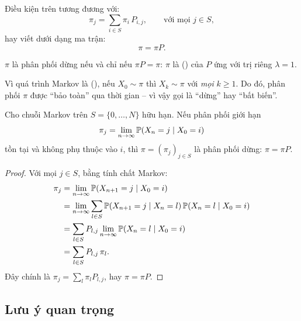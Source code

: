 Điều kiện trên tương đương với:
\begin{equation}\label{eq:stationary-condition}
  \pi_j = \sum_{i \in S} \pi_i \, P_{i,j}, \qquad \text{với mọi } j \in S,
\end{equation}
hay viết dưới dạng ma trận:
\begin{equation}\label{eq:pi-P}
  \boxed{\pi = \pi P.}
\end{equation}

\begin{tomtat}
$\pi$ là phân phối dừng nếu và chỉ nếu $\pi P = \pi$:
$\pi$ là  () của $P$ ứng với trị riêng $\lambda = 1$.

Vì quá trình Markov là  (),
nếu $X_0 \sim \pi$ thì $X_k \sim \pi$ với \emph{mọi} $k \geq 1$.
Do đó, phân phối $\pi$ được ``bảo toàn'' qua thời gian -- vì vậy gọi là ``dừng'' hay ``bất biến''.
\end{tomtat}

\begin{proposition}
\label{prop:limiting-is-stationary}
Cho chuỗi Markov trên $S = \{0, \ldots, N\}$ hữu hạn. Nếu phân phối giới hạn
\[
  \pi_j = \lim_{n\to\infty} \mathbb{P}(X_n = j \mid X_0 = i)
\]
tồn tại và không phụ thuộc vào $i$, thì $\pi = (\pi_j)_{j\in S}$ là phân phối dừng: $\pi = \pi P$.
\end{proposition}

\begin{proof}
Với mọi $j \in S$, bằng tính chất Markov:
\begin{align*}
  \pi_j
  &= \lim_{n\to\infty} \mathbb{P}(X_{n+1} = j \mid X_0 = i) \\
  &= \lim_{n\to\infty} \sum_{l \in S} \mathbb{P}(X_{n+1} = j \mid X_n = l) \, \mathbb{P}(X_n = l \mid X_0 = i) \\
  &= \sum_{l \in S} P_{l,j} \lim_{n\to\infty} \mathbb{P}(X_n = l \mid X_0 = i) \\
  &= \sum_{l \in S} P_{l,j} \, \pi_l.
\end{align*}
Đây chính là $\pi_j = \sum_{l} \pi_l P_{l,j}$, hay $\pi = \pi P$.
\end{proof}

\subsection{Lưu ý quan trọng}
\label{subsec:periodic-no-limit}

